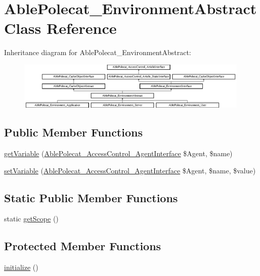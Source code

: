 \hypertarget{class_able_polecat___environment_abstract}{}\section{Able\+Polecat\+\_\+\+Environment\+Abstract Class Reference}
\label{class_able_polecat___environment_abstract}
Inheritance diagram for Able\+Polecat\+\_\+\+Environment\+Abstract\+:\begin{figure}[H]
\begin{center}
\leavevmode
\includegraphics[height=2.258065cm]{class_able_polecat___environment_abstract}
\end{center}
\end{figure}
\subsection*{Public Member Functions}
\begin{DoxyCompactItemize}
\item 
\hyperlink{class_able_polecat___environment_abstract_a43e9b59dc23869d178f5cb5ba03624cb}{get\+Variable} (\hyperlink{interface_able_polecat___access_control___agent_interface}{Able\+Polecat\+\_\+\+Access\+Control\+\_\+\+Agent\+Interface} \$Agent, \$name)
\item 
\hyperlink{class_able_polecat___environment_abstract_ad27dfd656f899086322b7c16059dcc40}{set\+Variable} (\hyperlink{interface_able_polecat___access_control___agent_interface}{Able\+Polecat\+\_\+\+Access\+Control\+\_\+\+Agent\+Interface} \$Agent, \$name, \$value)
\end{DoxyCompactItemize}
\subsection*{Static Public Member Functions}
\begin{DoxyCompactItemize}
\item 
static \hyperlink{class_able_polecat___environment_abstract_ad9ade868bd136d32967059d1cccb3e92}{get\+Scope} ()
\end{DoxyCompactItemize}
\subsection*{Protected Member Functions}
\begin{DoxyCompactItemize}
\item 
\hyperlink{class_able_polecat___environment_abstract_a91098fa7d1917ce4833f284bbef12627}{initialize} ()
\end{DoxyCompactItemize}


